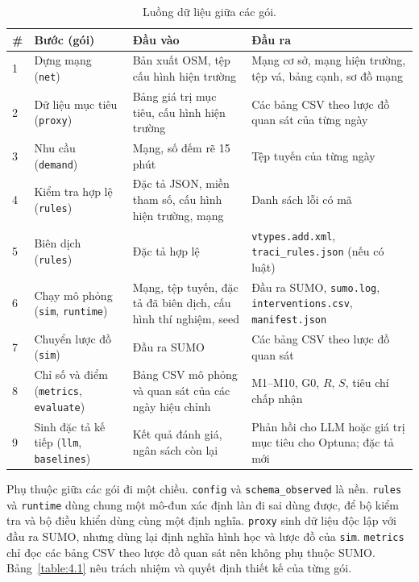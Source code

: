 \documentclass[../main.tex]{subfiles}
\begin{document}
\begin{table}[!htbp]
\centering
\small
\caption{Luồng dữ liệu giữa các gói.} \label{table:4.2}
\begin{tabular}{|p{0.6cm}|>{\raggedright\arraybackslash}p{3.4cm}|>{\raggedright\arraybackslash}p{3.6cm}|>{\raggedright\arraybackslash}p{4.9cm}|}
\hline
\textbf{\#} & \textbf{Bước (gói)} & \textbf{Đầu vào} & \textbf{Đầu ra} \\ \hline
1 & Dựng mạng (\texttt{net}) & Bản xuất OSM, tệp cấu hình hiện trường & Mạng cơ sở, mạng hiện trường, tệp vá, bảng cạnh, sơ đồ mạng \\ \hline
2 & Dữ liệu mục tiêu (\texttt{proxy}) & Bảng giá trị mục tiêu, cấu hình hiện trường & Các bảng CSV theo lược đồ quan sát của từng ngày \\ \hline
3 & Nhu cầu (\texttt{demand}) & Mạng, số đếm rẽ 15 phút & Tệp tuyến của từng ngày \\ \hline
4 & Kiểm tra hợp lệ (\texttt{rules}) & Đặc tả JSON, miền tham số, cấu hình hiện trường, mạng & Danh sách lỗi có mã \\ \hline
5 & Biên dịch (\texttt{rules}) & Đặc tả hợp lệ & \texttt{vtypes.add.xml}, \texttt{traci\_\allowbreak rules.json} (nếu có luật) \\ \hline
6 & Chạy mô phỏng (\texttt{sim}, \texttt{runtime}) & Mạng, tệp tuyến, đặc tả đã biên dịch, cấu hình thí nghiệm, seed & Đầu ra SUMO, \texttt{sumo.log}, \texttt{interventions.csv}, \texttt{manifest.json} \\ \hline
7 & Chuyển lược đồ (\texttt{sim}) & Đầu ra SUMO & Các bảng CSV theo lược đồ quan sát \\ \hline
8 & Chỉ số và điểm (\texttt{metrics}, \texttt{evaluate}) & Bảng CSV mô phỏng và quan sát của các ngày hiệu chỉnh & M1--M10, G0, $R$, $S$, tiêu chí chấp nhận \\ \hline
9 & Sinh đặc tả kế tiếp (\texttt{llm}, \texttt{baselines}) & Kết quả đánh giá, ngân sách còn lại & Phản hồi cho LLM hoặc giá trị mục tiêu cho Optuna; đặc tả mới \\ \hline
\end{tabular}
\end{table}

Phụ thuộc giữa các gói đi một chiều. \texttt{config} và \texttt{schema\_observed} là nền. \texttt{rules} và \texttt{runtime} dùng chung một mô-đun xác định làn đi sai dùng được, để bộ kiểm tra và bộ điều khiển dùng cùng một định nghĩa. \texttt{proxy} sinh dữ liệu độc lập với đầu ra SUMO, nhưng dùng lại định nghĩa hình học và lược đồ của \texttt{sim}. \texttt{metrics} chỉ đọc các bảng CSV theo lược đồ quan sát nên không phụ thuộc SUMO. Bảng~\ref{table:4.1} nêu trách nhiệm và quyết định thiết kế của từng gói.
\end{document}
